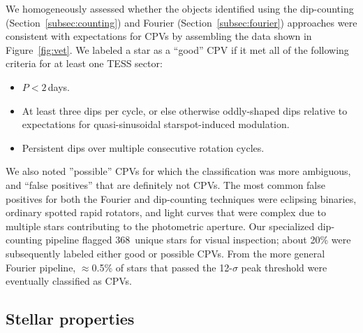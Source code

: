 \documentclass[11pt,twocolumn,tighten,linenumbers]{aastex63}
\newcommand{\nuniqdipflagged}{{368}} %
\begin{document}
We homogeneously assessed whether the objects identified using the
dip-counting (Section~\ref{subsec:counting}) and Fourier
(Section~\ref{subsec:fourier}) approaches were consistent with
expectations for CPVs by assembling the data shown in
Figure~\ref{fig:vet}.  We labeled a star as a ``good'' CPV if it met
all of the following criteria for at least one TESS sector:
\vspace{-2pt}
\begin{itemize}[leftmargin=*]
  \setlength\itemsep{-2pt}
  \item $P<2$\,days.
  \item At least three dips per cycle, or else otherwise oddly-shaped
    dips relative to expectations for quasi-sinusoidal
    starspot-induced modulation.
  \item Persistent dips over multiple consecutive rotation cycles.
\end{itemize}
\vspace{-2pt}
We also noted ''possible'' CPVs for which the classification was more
ambiguous, and ``false positives'' that are definitely not CPVs.  The
most common false positives for both the Fourier and dip-counting
techniques were eclipsing binaries, ordinary spotted rapid rotators,
and light curves that were complex due to multiple stars contributing
to the photometric aperture.  Our specialized dip-counting pipeline
flagged \nuniqdipflagged\ unique stars for visual inspection; about
20\% were subsequently labeled either good or possible CPVs.  From the
more general Fourier pipeline, $\approx$0.5\% of stars that passed the
12-$\sigma$ peak threshold were eventually classified as CPVs.



\subsection{Stellar properties}
\label{subsec:starprops}
\end{document}
